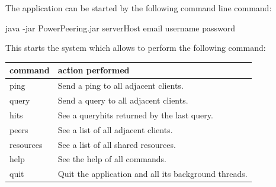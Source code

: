 \documentclass{article}
\begin{document}
The application can be started by the following command line command:

\noindent
java -jar PowerPeering.jar serverHost email username password

\noindent
This starts the system which allows to perform the following command:
\newline
\noindent
\begin{tabular}{|ll|} 
\hline
command & action performed \\
\hline 
ping &  Send a ping to all adjacent clients. \\
query &  Send a query to all adjacent clients. \\
hits &  See a queryhits returned by the last query. \\
peers & See a list of all adjacent clients. \\
resources &  See a list of all shared resources. \\
help &  See the help of all commands. \\
quit &  Quit the application and all its background threads. \\
\hline 
\end{tabular}
\end{document}
